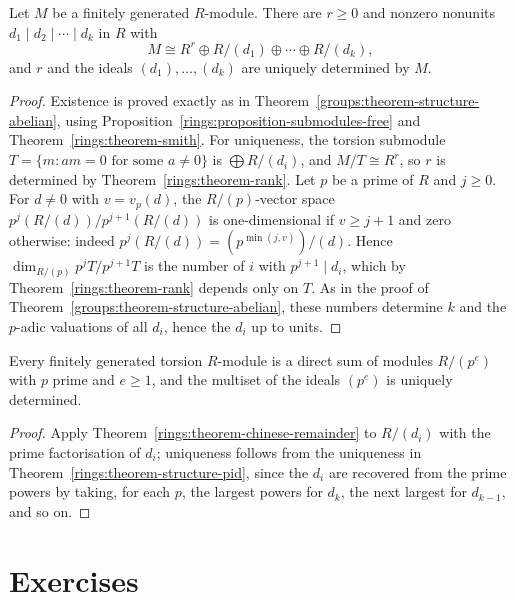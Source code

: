 \begin{theorem}\label{rings:theorem-structure-pid}
Let $M$ be a finitely generated $R$-module. There are $r \geq 0$ and nonzero nonunits
$d_1 \mid d_2 \mid \cdots \mid d_k$ in $R$ with
\[
M \cong R^r \oplus R/(d_1) \oplus \cdots \oplus R/(d_k),
\]
and $r$ and the ideals $(d_1), \ldots, (d_k)$ are uniquely determined by $M$.
\end{theorem}

\begin{proof}
Existence is proved exactly as in Theorem~\ref{groups:theorem-structure-abelian}, using
Proposition~\ref{rings:proposition-submodules-free} and Theorem~\ref{rings:theorem-smith}.
For uniqueness, the torsion submodule $T = \{m : am = 0 \text{ for some } a \neq 0\}$ is
$\bigoplus R/(d_i)$, and $M/T \cong R^r$, so $r$ is determined by Theorem~\ref{rings:theorem-rank}.
Let $p$ be a prime of $R$ and $j \geq 0$. For $d \neq 0$ with $v = v_p(d)$, the $R/(p)$-vector
space $p^j(R/(d))/p^{j+1}(R/(d))$ is one-dimensional if $v \geq j + 1$ and zero otherwise:
indeed $p^j(R/(d)) = (p^{\min(j, v)})/(d)$. Hence $\dim_{R/(p)} p^jT/p^{j+1}T$ is the number of
$i$ with $p^{j+1} \mid d_i$, which by Theorem~\ref{rings:theorem-rank} depends only on $T$. As in
the proof of Theorem~\ref{groups:theorem-structure-abelian}, these numbers determine $k$
and the $p$-adic valuations of all $d_i$, hence the $d_i$ up to units.
\end{proof}

\begin{corollary}\label{rings:corollary-primary-decomposition}
Every finitely generated torsion $R$-module is a direct sum of modules
$R/(p^e)$ with $p$ prime and $e \geq 1$, and the multiset of the ideals $(p^e)$ is
uniquely determined.
\end{corollary}

\begin{proof}
Apply Theorem~\ref{rings:theorem-chinese-remainder} to $R/(d_i)$ with the prime factorisation
of $d_i$; uniqueness follows from the uniqueness in Theorem~\ref{rings:theorem-structure-pid},
since the $d_i$ are recovered from the prime powers by taking, for each $p$, the largest
powers for $d_k$, the next largest for $d_{k-1}$, and so on.
\end{proof}

\section{Exercises}\label{rings:section-exercises}

